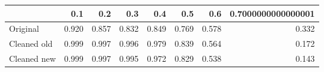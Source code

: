 \begin{tabular}{lrrrrrrr}
\toprule
{} &   0.1 &   0.2 &   0.3 &   0.4 &   0.5 &   0.6 & 0.7000000000000001 \\
\midrule
Original    & 0.920 & 0.857 & 0.832 & 0.849 & 0.769 & 0.578 &              0.332 \\
Cleaned old & 0.999 & 0.997 & 0.996 & 0.979 & 0.839 & 0.564 &              0.172 \\
Cleaned new & 0.999 & 0.997 & 0.995 & 0.972 & 0.829 & 0.538 &              0.143 \\
\bottomrule
\end{tabular}
